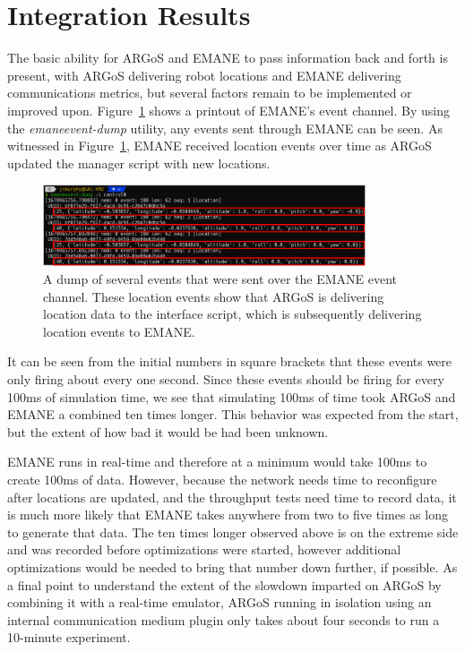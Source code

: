 \section{Integration Results}
The basic ability for ARGoS and EMANE to pass information back and forth is present, with ARGoS delivering robot locations and EMANE delivering communications metrics, but several factors remain to be implemented or improved upon.
Figure~\ref{emane_locs} shows a printout of EMANE's event channel.
By using the \textit{emaneevent-dump} utility, any events sent through EMANE can be seen.
As witnessed in Figure~\ref{emane_locs}, EMANE received location events over time as ARGoS updated the manager script with new locations.
\begin{figure}[!ht]
    \centering
    \includegraphics[width=0.85\textwidth,keepaspectratio]{Images/Chpt5/ARGoS_Events_EMANE_annotated.png}
    \caption{A dump of several events that were sent over the EMANE event channel. These location events show that ARGoS is delivering location data to the interface script, which is subsequently delivering location events to EMANE.}
    \label{emane_locs}
\end{figure}
It can be seen from the initial numbers in square brackets that these events were only firing about every one second.
Since these events should be firing for every 100ms of simulation time, we see that simulating 100ms of time took ARGoS and EMANE a combined ten times longer.
This behavior was expected from the start, but the extent of how bad it would be had been unknown.\par
EMANE runs in real-time and therefore at a minimum would take 100ms to create 100ms of data.
However, because the network needs time to reconfigure after locations are updated, and the throughput tests need time to record data, it is much more likely that EMANE takes anywhere from two to five times as long to generate that data.
The ten times longer observed above is on the extreme side and was recorded before optimizations were started, however additional optimizations would be needed to bring that number down further, if possible.
As a final point to understand the extent of the slowdown imparted on ARGoS by combining it with a real-time emulator, ARGoS running in isolation using an internal communication medium plugin only takes about four seconds to run a 10-minute experiment.
